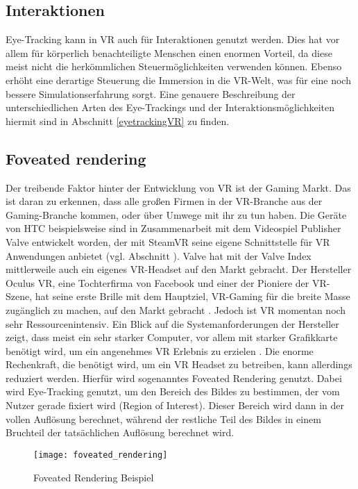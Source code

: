\subsection{Interaktionen}
Eye-Tracking kann in VR auch für Interaktionen genutzt werden. Dies hat vor allem für körperlich benachteiligte Menschen einen enormen Vorteil, da diese meist nicht die herkömmlichen Steuermöglichkeiten verwenden können. Ebenso erhöht eine derartige Steuerung die Immersion in die VR-Welt, was für eine noch bessere Simulationserfahrung sorgt. Eine genauere Beschreibung der unterschiedlichen Arten des Eye-Trackings und der Interaktionsmöglichkeiten hiermit sind in Abschnitt \ref{eyetrackingVR} zu finden. 

\subsection{Foveated rendering}
Der treibende Faktor hinter der Entwicklung von VR ist der Gaming Markt. Das ist daran zu erkennen, dass alle großen Firmen in der VR-Branche aus der Gaming-Branche kommen, oder über Umwege mit ihr zu tun haben. Die Geräte von HTC beispielsweise sind in Zusammenarbeit mit dem Videospiel Publisher Valve entwickelt worden, der mit SteamVR seine eigene Schnittstelle für VR Anwendungen anbietet (vgl. Abschnitt ). Valve hat mit der Valve Index mittlerweile auch ein eigenes VR-Headset auf den Markt gebracht. Der Hersteller Oculus VR, eine Tochterfirma von Facebook und einer der Pioniere der VR-Szene, hat seine erste Brille mit dem Hauptziel, VR-Gaming für die breite Masse zugänglich zu machen, auf den Markt gebracht \cite{OculusKickstarter}. Jedoch ist VR momentan noch sehr Ressourcenintensiv. Ein Blick auf die Systemanforderungen der Hersteller zeigt, dass meist ein sehr starker Computer, vor allem mit starker Grafikkarte benötigt wird, um ein angenehmes VR Erlebnis zu erzielen \cite{Lang.2019}. Die enorme Rechenkraft, die benötigt wird, um ein VR Headset zu betreiben, kann allerdings reduziert werden. Hierfür wird  sogenanntes Foveated Rendering genutzt. Dabei wird Eye-Tracking genutzt, um den Bereich des Bildes zu bestimmen, der vom Nutzer gerade fixiert wird (Region of Interest). Dieser Bereich wird dann in der vollen Auflösung berechnet, während der restliche Teil des Bildes in einem Bruchteil der tatsächlichen Auflösung berechnet wird. 
\begin{figure}
	\centering
	\texttt{[image: foveated\_rendering]}
	\caption[Foveated Rendering Beispiel]{Foveated Rendering Beispiel \cite{Albert.2017}}
	\label{fig:foveated}
\end{figure}


